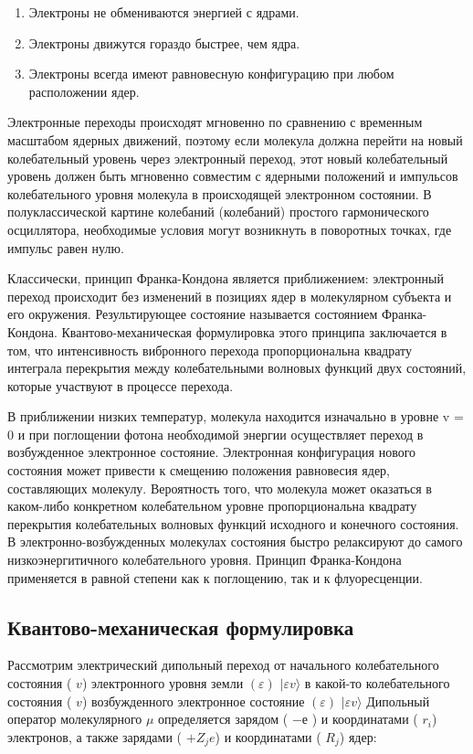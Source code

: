 \documentclass[a4paper,14pt,russian]{article}
\begin{document}
\begin{enumerate}
\item
Электроны не обмениваются энергией с ядрами.
\item
Электроны движутся гораздо быстрее, чем ядра.
\item
Электроны всегда имеют равновесную конфигурацию при любом расположении ядер.
\end{enumerate}

Электронные переходы происходят мгновенно по сравнению с временным масштабом ядерных движений, поэтому если молекула должна перейти на новый колебательный уровень через электронный переход, этот новый колебательный уровень должен быть мгновенно совместим с ядерными положений и импульсов колебательного уровня молекула в происходящей электронном состоянии. В полуклассической картине колебаний (колебаний) простого гармонического осциллятора, необходимые условия могут возникнуть в поворотных точках, где импульс равен нулю.

Классически, принцип Франка-Кондона является приближением: электронный переход происходит без изменений в позициях ядер в молекулярном субъекта и его окружения. Результирующее состояние называется состоянием Франка-Кондона. Квантово-механическая формулировка этого принципа заключается в том, что интенсивность вибронного перехода пропорциональна квадрату интеграла перекрытия между колебательными волновых функций двух состояний, которые участвуют в процессе перехода.

В приближении низких температур, молекула находится изначально в уровне v = 0 и при поглощении фотона необходимой энергии осуществляет переход в возбужденное электронное состояние. Электронная конфигурация нового состояния может привести к смещению положения равновесия ядер, составляющих молекулу. Вероятность того, что молекула может оказаться в каком-либо конкретном колебательном уровне пропорциональна квадрату перекрытия колебательных волновых функций исходного и конечного состояния. В электронно-возбужденных молекулах состояния быстро релаксируют до самого низкоэнергитичного колебательного уровня. Принцип Франка-Кондона применяется в равной степени как к поглощению, так и к флуоресценции.

\subsection{Квантово-механическая формулировка}

Рассмотрим электрический дипольный переход от начального колебательного состояния (
$
v
$) электронного уровня земли $(\varepsilon)$
$
|\varepsilon v\rangle
$
в какой-то колебательного состояния (
$
v
$) возбужденного электронное состояние $(\varepsilon)$
$
|\varepsilon v\rangle
$
Дипольный оператор молекулярного 
$
\mu
$
определяется зарядом (
$
-е
$
) и координатами (
$
r_i
$) электронов, а также зарядами (
$
+Z_je
$) и координатами (
$
R_j
$) ядер:
\end{document}
